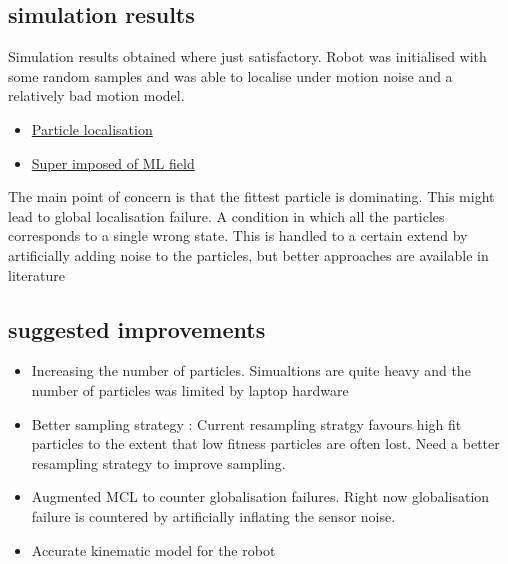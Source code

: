 \documentclass{article}
\begin{document}
\subsection{simulation results}
Simulation results obtained where just satisfactory. 
Robot was initialised with some random samples and was able to localise under motion noise and a relatively bad motion model.
\begin{itemize}
        \item \href{https://github.com/aswinpajayan/seminar-related/blob/master/gifs/MCL-final.gif}{Particle localisation}

        \item  \href{https://github.com/aswinpajayan/seminar-related/blob/master/gifs/sensorScans.gif}{Super imposed of ML field}
    \end{itemize}

The main point of concern is that the fittest particle is dominating. This might lead to global localisation failure. A condition in which all the particles corresponds to a single wrong state. This is handled to a certain extend by artificially adding noise to the particles, but better approaches are available in literature
\subsection{suggested improvements}
    \begin{itemize}
        \item Increasing the number of particles. Simualtions are quite heavy and the number of particles was limited by laptop hardware
        \item Better sampling strategy : Current resampling stratgy favours high fit particles to the extent that low fitness particles are often lost. Need a better resampling strategy to improve sampling.
        \item Augmented MCL to counter globalisation failures. Right now globalisation failure is countered by artificially inflating the sensor noise.
        \item Accurate kinematic model for the robot
    \end{itemize}
\end{document}
